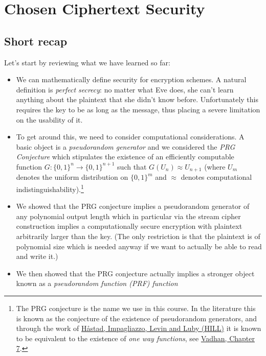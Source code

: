 \chapter{Chosen Ciphertext Security}\label{6-Chosen-Ciphertext-Secu}

\section{Short recap}\label{6-Short-recap}

Let's start by reviewing what we have learned so far:

\begin{itemize}
\item
  We can mathematically define security for encryption schemes. A
  natural definition is \emph{perfect secrecy}: no matter what Eve does,
  she can't learn anything about the plaintext that she didn't know
  before. Unfortunately this requires the key to be as long as the
  message, thus placing a severe limitation on the usability of it.
\item
  To get around this, we need to consider computational considerations.
  A basic object is a \emph{pseudorandom generator} and we considered
  the \emph{PRG Conjecture} which stipulates the existence of an
  efficiently computable function
  \(G:\{0,1\}^n\rightarrow\{0,1\}^{n+1}\) such that
  \(G(U_n)\approx U_{n+1}\) (where \(U_m\) denotes the uniform
  distribution on \(\{0,1\}^m\) and \(\approx\) denotes computational
  indistinguishability).\footnote{The PRG conjecture is the name we use
    in this course. In the literature this is known as the conjecture of
    the existence of pseudorandom generators, and through the work of
    \href{https://www.csc.kth.se/~johanh/prgfromowf.pdf}{Håstad,
    Impagliazzo, Levin and Luby (HILL)} it is known to be equivalent to
    the existence of \emph{one way functions}, see
    \href{https://people.seas.harvard.edu/~salil/pseudorandomness/}{Vadhan,
    Chapter 7}.}
\item
  We showed that the PRG conjecture implies a pseudorandom generator of
  any polynomial output length which in particular via the stream cipher
  construction implies a computationally secure encryption with
  plaintext arbitrarily larger than the key. (The only restriction is
  that the plaintext is of polynomial size which is needed anyway if we
  want to actually be able to read and write it.)
\item
  We then showed that the PRG conjecture actually implies a stronger
  object known as a \emph{pseudorandom function (PRF) function
}
\end{itemize}
